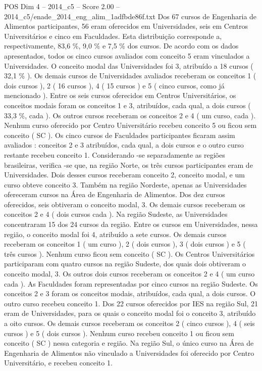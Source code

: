 \begin{textsample}{POS Dim 4 – 2014\_c5 – Score 2.00 – 2014\_c5/enade\_2014\_eng\_alim\_1adfbde86f.txt}
Dos 67 cursos de Engenharia de Alimentos participantes, 56 eram oferecidos em Universidades, seis em Centros Universitários e cinco em Faculdades.
Esta distribuição corresponde a, respectivamente, 83,6 \%, 9,0 \% e 7,5 \% dos cursos.
De acordo com os dados apresentados, todos os cinco cursos avaliados com conceito 5 eram vinculados a Universidades.
O conceito modal das Universidades foi 3, atribuído a 18 cursos ( 32,1 \% ).
Os demais cursos de Universidades avaliados receberam os conceitos 1 ( dois cursos ), 2 ( 16 cursos ), 4 ( 15 cursos ) e 5 ( cinco cursos, como já mencionado ).
Entre os seis cursos oferecidos em Centros Universitários, os conceitos modais foram os conceitos 1 e 3, atribuídos, cada qual, a dois cursos ( 33,3 \%, cada ).
Os outros cursos receberam os conceitos 2 e 4 ( um curso, cada ).
Nenhum curso oferecido por Centro Universitário recebeu conceito 5 ou ficou sem conceito ( SC ).
Os cinco cursos de Faculdades participantes ficaram assim avaliados : conceitos 2 e 3 atribuídos, cada qual, a dois cursos e o outro curso restante recebeu conceito 1.
Considerando -se separadamente as regiões brasileiras, verifica -se que, na região Norte, os três cursos participantes eram de Universidades.
Dois desses cursos receberam conceito 2, conceito modal, e um curso obteve conceito 3.
Também na região Nordeste, apenas as Universidades ofereceram cursos na Área de Engenharia de Alimentos.
Dos dez cursos oferecidos, seis obtiveram o conceito modal, 3.
Os demais cursos receberam os conceitos 2 e 4 ( dois cursos cada ).
Na região Sudeste, as Universidades concentraram 15 dos 24 cursos da região.
Entre os cursos em Universidades, nessa região, o conceito modal foi 4, atribuído a sete cursos.
Os demais cursos receberam os conceitos 1 ( um curso ), 2 ( dois cursos ), 3 ( dois cursos ) e 5 ( três cursos ).
Nenhum curso ficou sem conceito ( SC ).
Os Centros Universitários participaram com quatro cursos na região Sudeste, dos quais dois obtiveram o conceito modal, 3.
Os outros dois cursos receberam os conceitos 2 e 4 ( um curso cada ).
As Faculdades foram representadas por cinco cursos na região Sudeste.
Os conceitos 2 e 3 foram os conceitos modais, atribuídos, cada qual, a dois cursos.
O outro curso recebeu conceito 1.
Dos 22 cursos oferecidos por IES na região Sul, 21 eram de Universidades, para os quais o conceito modal foi o conceito 3, atribuído a oito cursos.
Os demais cursos receberam os conceitos 2 ( cinco cursos ), 4 ( seis cursos ) e 5 ( dois cursos ).
Nenhum curso recebeu conceito 1 ou ficou sem conceito ( SC ) nessa categoria e região.
Na região Sul, o único curso na Área de Engenharia de Alimentos não vinculado a Universidades foi oferecido por Centro Universitário, e recebeu conceito 1.

\end{textsample}

